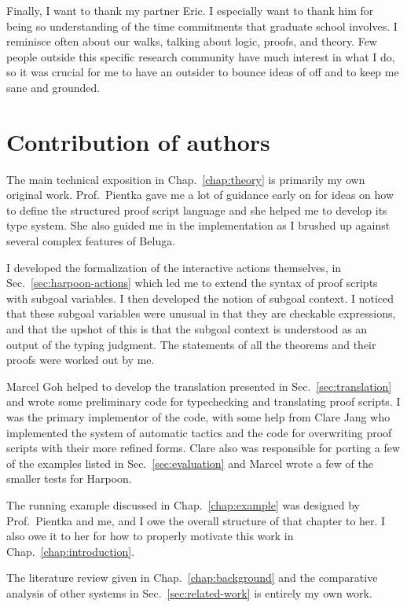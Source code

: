 Finally, I want to thank my partner Eric. I especially want to thank him for
being so understanding of the time commitments that graduate school involves. I
reminisce often about our walks, talking about logic, proofs, and theory. Few
people outside this specific research community have much interest in what I do,
so it was crucial for me to have an outsider to bounce ideas of off and to keep
me sane and grounded.

\section*{Contribution of authors}

The main technical exposition in Chap.~\ref{chap:theory} is primarily my own
original work. Prof.~Pientka gave me a lot of guidance early on for ideas on how
to define the structured proof script language and she helped me to develop its
type system. She also guided me in the implementation as I brushed up against
several complex features of Beluga.

I developed the formalization of the interactive actions themselves, in
Sec.~\ref{sec:harpoon-actions} which led me to extend the syntax of proof
scripts with subgoal variables. I then developed the notion of subgoal context.
I noticed that these subgoal variables were unusual in that they are checkable
expressions, and that the upshot of this is that the subgoal context is
understood as an output of the typing judgment.
The statements of all the theorems and their proofs were worked out by me.

Marcel Goh helped to develop the translation presented in
Sec.~\ref{sec:translation} and wrote some preliminary code for typechecking and
translating proof scripts. I was the primary implementor of the code, with some
help from Clare Jang who implemented the system of automatic tactics and the
code for overwriting proof scripts with their more refined forms.
Clare also was responsible for porting a few of the examples listed in
Sec.~\ref{sec:evaluation} and Marcel wrote a few of the smaller tests for
Harpoon.

The running example discussed in Chap.~\ref{chap:example} was designed by
Prof.~Pientka and me, and I owe the overall structure of that chapter to her.
I also owe it to her for how to properly motivate this work in
Chap.~\ref{chap:introduction}.

The literature review given in Chap.~\ref{chap:background}
and the comparative analysis of other systems in Sec.~\ref{sec:related-work} is
entirely my own work.

